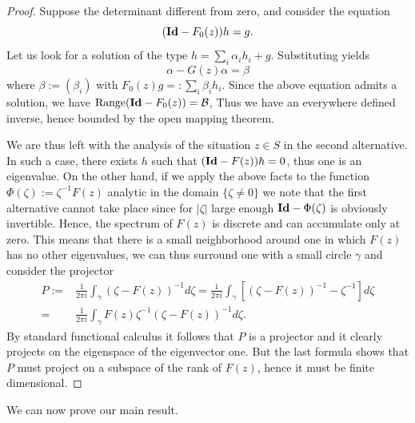 \documentclass{amsart}
\numberwithin{equation}{section}
\newcommand\B{{\mathcal B}}
\newcommand\Id{\text{\bf Id}}
\begin{document}
\begin{proof}
Suppose the determinant different from zero, and consider the equation
\[
(\Id-F_0(z))h=g.
\]
Let us look for a solution of the type $h=\sum_i\alpha_i h_i
+g$. Substituting yields
\[
\alpha- G(z)\alpha=\beta
\]
where $\beta:=(\beta_i)$ with $F_0(z)g=:\sum_i\beta_i h_i$. Since the
above equation admits a 
solution, we have $\text{Range}(\Id-F_0(z))=\B$, Thus we have an
everywhere defined inverse, hence bounded by the open mapping theorem.

We are thus left with the analysis of the situation $z\in S$ in the
second alternative. In such a case, there exists $h$ such that
$(\Id-F(z))h=0$, thus one is an eigenvalue. On the other hand, if we
apply the above facts to the function $\Phi(\zeta):=\zeta^{-1}F(z)$
analytic in the domain $\{\zeta\neq 0\}$ we note that the first
alternative cannot take place since for $|\zeta|$ large enough
$\Id-\Phi(\zeta)$ is obviously invertible. Hence, the spectrum of
$F(z)$ is discrete and can accumulate only at zero. This means that
there is a small neighborhood around one in which $F(z)$ has no
other eigenvalues, we can thus surround one with a small circle
$\gamma$ and consider the projector
\[
\begin{split}
P:=&\frac1{2\pi i}\int_\gamma (\zeta-F(z))^{-1}d\zeta=\frac1{2\pi
i}\int_\gamma \left[(\zeta-F(z))^{-1}-\zeta^{-1}\right]d \zeta\\
=&\frac1{2\pi i}\int_\gamma F(z)\zeta^{-1}(\zeta-F(z))^{-1}d\zeta.
\end{split}
\]
By standard functional calculus it follows that $P$ is a projector and
it clearly projects on the eigenspace of the eigenvector one. But
the last formula shows that $P$ must project on a subspace of the rank
of $F(z)$, hence it must be finite dimensional.
\end{proof}

We can now prove our main result.
\end{document}
